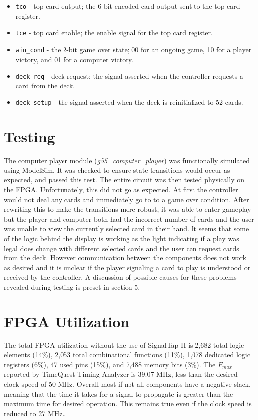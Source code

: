 \documentclass[12pt]{article}
\begin{document}
\begin{enumerate}
\begin{itemize}
\item \texttt{tco} - top card output; the 6-bit encoded card output sent to the top card register.
\item \texttt{tce} - top card enable; the enable signal for the top card register.
\item \texttt{win\_cond} - the 2-bit game over state; 00 for an ongoing game, 10 for a player victory, and 01 for a computer victory.
\item \texttt{deck\_req} - deck request; the signal asserted when the controller requests a card from the deck.
\item \texttt{deck\_setup} - the signal asserted when the deck is reinitialized to 52 cards.
\end{itemize}
\end{enumerate}

\section{Testing}
The computer player module (\textit{g55\_computer\_player}) was functionally simulated using ModelSim. It was checked to ensure state transitions would occur as expected, and passed this test. The entire circuit was then tested physically on the FPGA. Unfortunately, this did not go as expected. At first the controller would not deal any cards and immediately go to to a game over condition. After rewriting this to make the transitions more robust, it was able to enter gameplay but the player and computer both had the incorrect number of cards and the user was unable to view the currently selected card in their hand. It seems that some of the logic behind the display is working as the light indicating if a play was legal does change with different selected cards and the user can request cards from the deck. However communication between the components does not work as desired and it is unclear if the player signaling a card to play is understood or received by the controller. A discussion of possible causes for these problems revealed during testing is preset in section 5.

\section{FPGA Utilization}
The total FPGA utilization without the use of SignalTap II is 2,682 total logic elements (14\%), 2,053 total combinational functions (11\%), 1,078 dedicated logic registers (6\%), 47 used pins (15\%), and 7,488 memory bits (3\%). The $F_{max}$ reported by TimeQuest Timing Analyzer is 39.07 MHz, less than the desired clock speed of 50 MHz. Overall most if not all components have a negative slack, meaning that the time it takes for a signal to propagate is greater than the maximum time for desired operation. This remains true even if the clock speed is reduced to 27 MHz..
\end{document}
